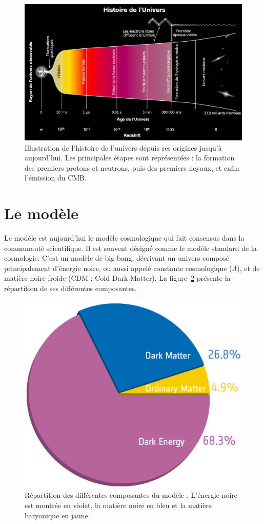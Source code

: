 \begin{figure}
  \centering
  \includegraphics[scale=0.35]{univershistory2}
  \caption{Illustration de l'histoire de l'univers depuis ses origines jusqu'à aujourd'hui. Les principales étapes sont représentées : la formation des premiers protons et neutrons, puis des premiers noyaux, et enfin l'émission du CMB.}
  \label{fig:univershistory}
\end{figure}


\section{Le modèle \lcdm{}}

Le modèle \lcdm{} est aujourd'hui le modèle cosmologique qui fait consensus dans la communauté scientifique. Il est souvent désigné comme le modèle standard de la cosmologie. C'est un modèle de big bang, décrivant un univers composé principalement d'énergie noire, ou aussi appelé constante cosmologique ($\Lambda$), et de matière noire froide (CDM : Cold Dark Matter). La figure~\ref{fig:lcdm} présente la répartition de ses différentes composantes.
\begin{figure}
  \centering
  \includegraphics[scale=0.3]{lcdm}
  \caption{Répartition des différentes composantes du modèle \lcdm{}. L'énergie noire est montrée en violet, la matière noire en bleu et la matière baryonique en jaune.}
  \label{fig:lcdm}
\end{figure}


